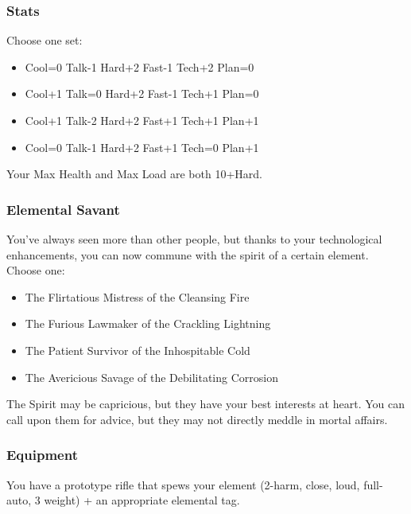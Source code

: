 \subsubsection{Stats}
Choose one set:
\begin{itemize}
\setlength\itemsep{0em}
\item Cool=0 Talk-1 Hard+2 Fast-1 Tech+2 Plan=0
\item Cool+1 Talk=0 Hard+2 Fast-1 Tech+1 Plan=0
\item Cool+1 Talk-2 Hard+2 Fast+1 Tech+1 Plan+1
\item Cool=0 Talk-1 Hard+2 Fast+1 Tech=0 Plan+1
\end{itemize}
Your Max Health and Max Load are both 10+Hard.

\subsubsection{Elemental Savant}
You've always seen more than other people, but thanks to your technological enhancements, you can now commune with the spirit of a certain element. Choose one:
\begin{itemize}
\item The Flirtatious Mistress of the Cleansing Fire
\item The Furious Lawmaker of the Crackling Lightning
\item The Patient Survivor of the Inhospitable Cold
\item The Avericious Savage of the Debilitating Corrosion
\end{itemize}
The Spirit may be capricious, but they have your best interests at heart. You can call upon them for advice, but they may not directly meddle in mortal affairs.



\subsubsection{Equipment}
You have a prototype rifle that spews your element (2-harm, close, loud, full-auto, 3 weight) + an appropriate elemental tag.

